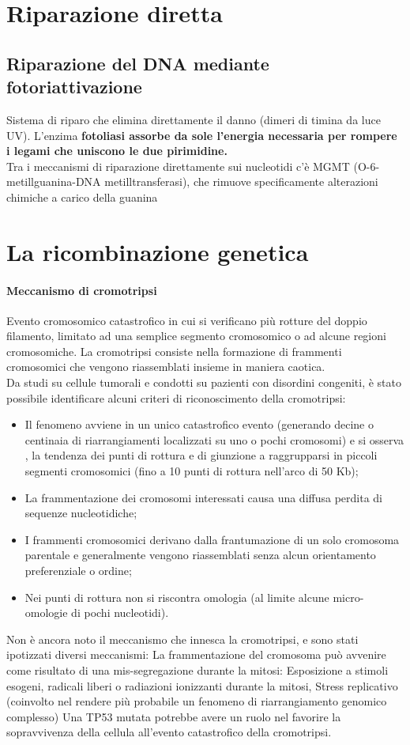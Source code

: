 \documentclass{article}
\begin{document}
\section{Riparazione diretta}
\subsection{Riparazione del DNA mediante fotoriattivazione} Sistema di riparo che elimina direttamente il danno (dimeri di timina da luce UV). L'enzima \textbf{fotoliasi assorbe da sole l'energia necessaria per rompere i legami che uniscono le due pirimidine.}\\
Tra i meccanismi di riparazione direttamente sui nucleotidi c'è MGMT (O-6- metillguanina-DNA metilltransferasi), che rimuove specificamente alterazioni chimiche a carico della guanina
\section{La ricombinazione genetica}
\paragraph{Meccanismo di cromotripsi}Evento cromosomico catastrofico in cui si verificano più rotture del doppio filamento, limitato ad una semplice segmento
cromosomico o ad alcune regioni cromosomiche. La cromotripsi consiste nella formazione di frammenti cromosomici che vengono riassemblati insieme in maniera caotica.\\
Da studi su cellule tumorali e condotti su pazienti con disordini congeniti, è stato possibile identificare alcuni criteri di riconoscimento della cromotripsi:
\begin{itemize}
    \item Il fenomeno avviene in un unico catastrofico evento (generando decine o centinaia di
    riarrangiamenti localizzati su uno o pochi cromosomi) e si osserva , la tendenza dei punti di
    rottura e di giunzione a raggrupparsi in piccoli segmenti cromosomici (fino a 10 punti di rottura
    nell'arco di 50 Kb);
    \item La frammentazione dei cromosomi interessati causa una diffusa perdita di sequenze nucleotidiche;
    \item I frammenti cromosomici derivano dalla frantumazione di un solo cromosoma parentale e
    generalmente vengono riassemblati senza alcun orientamento preferenziale o ordine;
    \item Nei punti di rottura non si riscontra omologia (al limite alcune micro-omologie di pochi nucleotidi).
\end{itemize}
Non è ancora noto il meccanismo che innesca la cromotripsi, e sono stati ipotizzati diversi meccanismi:
La frammentazione del cromosoma può avvenire come risultato di una mis-segregazione durante la mitosi:
Esposizione a stimoli esogeni, radicali liberi o radiazioni ionizzanti durante la mitosi,
Stress replicativo (coinvolto nel rendere più probabile un fenomeno di riarrangiamento genomico complesso)
Una TP53 mutata potrebbe avere un ruolo nel favorire la sopravvivenza della cellula all'evento catastrofico della cromotripsi.\\
\end{document}
